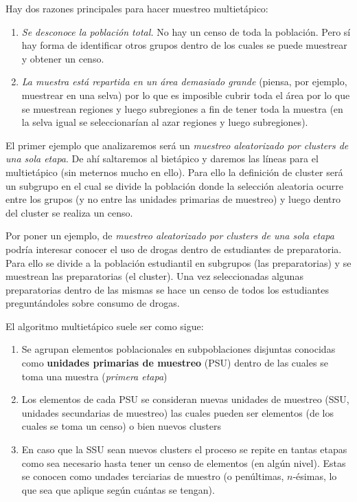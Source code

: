 \documentclass[
]{book}
\begin{document}
Hay dos razones principales para hacer muestreo multietápico:

\begin{enumerate}
\def\labelenumi{\alph{enumi}.}
\item
  \emph{Se desconoce la población total.} No hay un censo de toda la población. Pero sí hay forma de identificar otros grupos dentro de los cuales se puede muestrear y obtener un censo.
\item
  \emph{La muestra está repartida en un área demasiado grande} (piensa, por ejemplo, muestrear en una selva) por lo que es imposible cubrir toda el área por lo que se muestrean regiones y luego subregiones a fin de tener toda la muestra (en la selva igual se seleccionarían al azar regiones y luego subregiones).
\end{enumerate}

El primer ejemplo que analizaremos será un \emph{muestreo aleatorizado por clusters de una sola etapa}. De ahí saltaremos al bietápico y daremos las líneas para el multietápico (sin meternos mucho en ello). Para ello la definición de cluster será un subgrupo en el cual se divide la población donde la selección aleatoria ocurre entre los grupos (y no entre las unidades primarias de muestreo) y luego dentro del cluster se realiza un censo.

Por poner un ejemplo, de \emph{muestreo aleatorizado por clusters de una sola etapa} podría interesar conocer el uso de drogas dentro de estudiantes de preparatoria. Para ello se divide a la población estudiantil en subgrupos (las preparatorias) y se muestrean las preparatorias (el cluster). Una vez seleccionadas algunas preparatorias dentro de las mismas se hace un censo de todos los estudiantes preguntándoles sobre consumo de drogas.

El algoritmo multietápico suele ser como sigue:

\begin{enumerate}
\def\labelenumi{\alph{enumi}.}
\item
  Se agrupan elementos poblacionales en subpoblaciones disjuntas conocidas como \textbf{unidades primarias de muestreo} (PSU) dentro de las cuales se toma una muestra (\emph{primera etapa})
\item
  Los elementos de cada PSU se consideran nuevas unidades de muestreo (SSU, unidades secundarias de muestreo) las cuales pueden ser elementos (de los cuales se toma un censo) o bien nuevos clusters
\item
  En caso que la SSU sean nuevos clusters el proceso se repite en tantas etapas como sea necesario hasta tener un censo de elementos (en algún nivel). Estas se conocen como undades terciarias de muestro (o penúltimas, \(n\)-ésimas, lo que sea que aplique según cuántas se tengan).
\end{enumerate}
\end{document}

